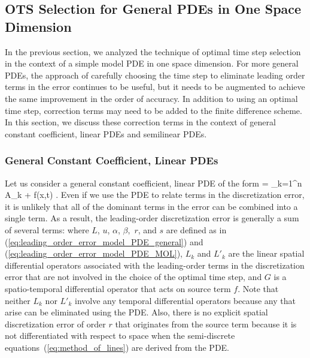 \documentclass[oneeqnum,onefignum,onetabnum,onethmnum]{siamltex}
\begin{document}
\subsection{\label{sec:ots_general_1d_pdes} 
            OTS Selection for General PDEs in One Space Dimension} 
In the previous section, we analyzed the technique of optimal time step 
selection in the context of a simple model PDE in one space dimension.  
For more general PDEs, the approach of carefully choosing the time step to 
eliminate leading order terms in the error continues to be useful, but it 
needs to be augmented to achieve the same improvement in the order of accuracy.
In addition to using an optimal time step, correction terms may need to be 
added to the finite difference scheme.  In this section, we discuss these 
correction terms in the context of general constant coefficient, linear PDEs 
and semilinear PDEs. 


\subsubsection*{\label{sec:ots_linear_pde} 
            General Constant Coefficient, Linear PDEs} 
Let us consider a general constant coefficient, linear PDE of the form
\beq
   = 
  \sum_{k=1}^n A_k  + f(x,t)
  \label{eq:linear_PDE}.
\eeq
Even if we use the PDE to relate terms in the discretization error, it is
unlikely that all of the dominant terms in the error can be combined into 
a single term.   As a result, the leading-order discretization error is
generally a sum of several terms:
\bea
  \dt{}
  \label{eq:leading_order_error_linear_PDE_MOL}
\eea
where $L$, $u$, $\alpha$, $\beta,$ $r$, and $s$ are defined as in
(\ref{eq:leading_order_error_model_PDE_general}) and
(\ref{eq:leading_order_error_model_PDE_MOL}), 
$L_k$ and $L'_k$ are the linear spatial differential operators associated 
with the leading-order terms in the discretization error that are not involved 
in the choice of the optimal time step, and $G$ is a spatio-temporal 
differential operator that acts on source term $f$.  
Note that neither $L_k$ nor $L'_k$ involve any temporal differential 
operators because any that arise can be eliminated using the PDE.  Also, 
there is no explicit spatial discretization error of order $r$ that originates 
from the source term because it is not differentiated with respect to space 
when the semi-discrete equations~(\ref{eq:method_of_lines}) are derived from 
the PDE.
\end{document}
